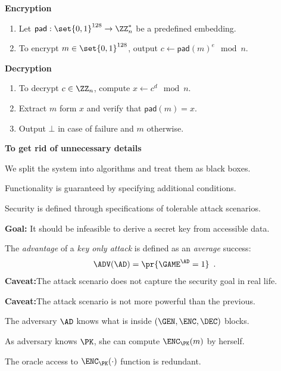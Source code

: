 \documentclass[landscape,footrule]{foils}
\begin{document}
\textbf{Encryption}
\begin{enumerate}
\item Let  $\mathsf{pad}:\set{0,1}^{128}\to\ZZ_n^*$ be a  predefined embedding.
\item To encrypt $m\in\set{0,1}^{128}$, output $c\gets\mathsf{pad}(m)^e \mod n$. 
\end{enumerate}
\bigskip

\textbf{Decryption}
\begin{enumerate}
\item To decrypt $c\in\ZZ_n$, compute $x\gets c^d\mod n$.
\item Extract $m$ form $x$ and verify that $\mathsf{pad}(m)=x$.
\item Output $\bot$ in case of failure and $m$ otherwise.
\end{enumerate}




\textbf{To get rid of unnecessary details}
\begin{triangles}
\item We split the system into algorithms and treat them as black
  boxes.
\item Functionality is guaranteed by specifying additional conditions.
\item Security is defined through  specifications of tolerable attack scenarios.
\end{triangles}


\textbf{Goal:}
It should be infeasible to derive a secret key from accessible data.
\bigskip

\bigskip

The \emph{advantage} of a \emph{key only attack} is defined as an \emph{average} success:
\begin{align*}
  \ADV(\AD)=\pr{\GAME^\AD=1}\enspace.
\end{align*}
\textbf{Caveat:}The attack scenario does not capture the security goal in real life.





\textbf{Caveat:}The attack scenario is not more powerful than the previous.
\begin{triangles}
  \item The adversary $\AD$ knows what is inside $(\GEN,\ENC,\DEC)$ blocks. 
  \item As adversary knows $\PK$,  she can compute $\ENC_\PK(m)$ by herself.  
  \item The oracle access to $\ENC_\PK(\cdot)$ function is redundant.
\end{triangles}
\end{document}
